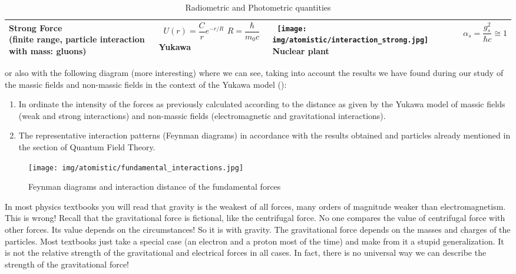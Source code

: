 \begin{table}[H]
\begin{center}
{\begin{tabular}{|m{5.5cm}|m{3.5cm}|m{3cm}|m{3cm}|}
		 \hline 
		 \pbox{5cm}{Strong Force \\ \tiny (finite range, particle interaction with mass: gluons)} & \centering\arraybackslash\ \pbox{5cm}{$U(r)=\dfrac{C}{r}e^{-r/R}$ \\ $R=\dfrac{\hbar}{m_0c}$ \\ \tiny Yukawa} & \centering\arraybackslash\  \pbox{5cm}{\texttt{[image: img/atomistic/interaction\_strong.jpg]} \\ \tiny Nuclear plant} & \centering\arraybackslash\ $\alpha_s=\dfrac{g_s^2}{\hbar c}\cong 1$ \\ 
		 \hline 
		 \end{tabular}}
		\caption[]{Radiometric and Photometric quantities}
		\end{center}
	\end{table}
	 or also with the following diagram (more interesting) where we can see, taking into account the results we have found during our study of the massic fields and non-massic fields in the context of the Yukawa model (): 
	\begin{enumerate}
		\item In ordinate the intensity of the forces as previously calculated according to the distance as given by the Yukawa model of massic fields (weak and strong interactions) and non-massic fields (electromagnetic and gravitational interactions).

		\item The representative interaction patterns (Feynman diagrams) in accordance with the results obtained and particles already mentioned in the section of Quantum Field Theory.
	\end{enumerate}
	\begin{figure}[H]
		\begin{center}
		\texttt{[image: img/atomistic/fundamental\_interactions.jpg]}
		\end{center}	
		\caption{Feynman diagrams and interaction distance of the fundamental forces}
	\end{figure}
	In most physics textbooks you will read that gravity is the weakest of all forces, many orders of magnitude weaker than electromagnetism. This is wrong! Recall that the gravitational force is fictional, like the centrifugal force. No one compares the value of centrifugal force with other forces. Its value depends on the circumstances! So it is with gravity. The gravitational force depends on the masses and charges of the particles. Most textbooks just take a special case (an electron and a proton most of the time) and make from it a stupid generalization. It is not the relative strength of the gravitational and electrical forces in all cases. In fact, there is no universal way we can describe the strength of the gravitational force!
	 
